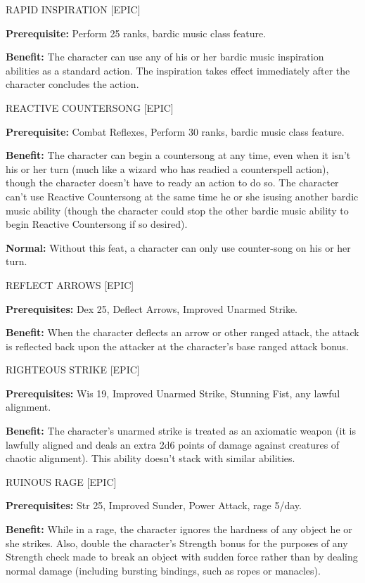 \documentclass{article}
\begin{document}
\vspace{12pt}
RAPID INSPIRATION [EPIC]

\textbf{Prerequisite:} Perform 25 ranks, bardic music class feature. 

\textbf{Benefit:} The character can use any of his or her bardic music inspiration 
abilities as a standard action. The inspiration takes effect immediately after 
the character concludes the action. 

\vspace{12pt}
REACTIVE COUNTERSONG [EPIC] 

\textbf{Prerequisite:} Combat Reflexes, Perform 30 ranks, bardic music class feature. 

\textbf{Benefit:} The character can begin a countersong at any time, even when 
it isn't his or her turn (much like a wizard who has readied a counterspell action), 
though the character doesn't have to ready an action to do so. The character can't 
use Reactive Countersong at the same time he or she isusing another bardic music 
ability (though the character could stop the other bardic music ability to begin 
Reactive Countersong if so desired). 

\textbf{Normal:} Without this feat, a character can only use counter-song on his 
or her turn. 

\vspace{12pt}
REFLECT ARROWS [EPIC] 

\textbf{Prerequisites:} Dex 25, Deflect Arrows, Improved Unarmed Strike. 

\textbf{Benefit:} When the character deflects an arrow or other ranged attack, 
the attack is reflected back upon the attacker at the character's base ranged attack 
bonus. 

\vspace{12pt}
RIGHTEOUS STRIKE [EPIC] 

\textbf{Prerequisites:} Wis 19, Improved Unarmed Strike, Stunning Fist, any lawful 
alignment. 

\textbf{Benefit:} The character's unarmed strike is treated as an axiomatic weapon 
(it is lawfully aligned and deals an extra 2d6 points of damage against creatures 
of chaotic alignment). This ability doesn't stack with similar abilities. 

\vspace{12pt}
RUINOUS RAGE [EPIC] 

\textbf{Prerequisites:} Str 25, Improved Sunder, Power Attack, rage 5/day. 

\textbf{Benefit:} While in a rage, the character ignores the hardness of any object 
he or she strikes. Also, double the character's Strength bonus for the purposes 
of any Strength check made to break an object with sudden force rather than by 
dealing normal damage (including bursting bindings, such as ropes or manacles). 
\end{document}
